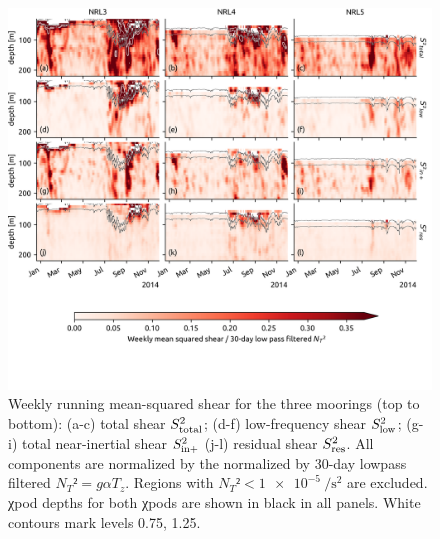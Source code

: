 \documentclass[onecol]{ametsoc}
\begin{document}
\begin{figure}
\centering
\includegraphics[width=\textwidth]{figure5-shears.png}
\caption{\label{fig:shears}
Weekly running mean-squared shear for the three moorings (top to bottom): (a-c) total shear \(S_\text{total}^2\); (d-f) low-frequency shear \(S_\text{low}^2\); (g-i) total near-inertial shear \(S_\text{in+}^2\) (j-l) residual shear \(S_\text{res}^2\). All components are normalized by the normalized by 30-day lowpass filtered \(N_T² = g \alpha T_z\). Regions with $N_T² < \SI{1e-5}{\per\second\squared}$ are excluded. χpod depths for both χpods are shown in black in all panels. White contours mark levels \num{0.75}, \num{1.25}.}
\end{figure}
\end{document}
